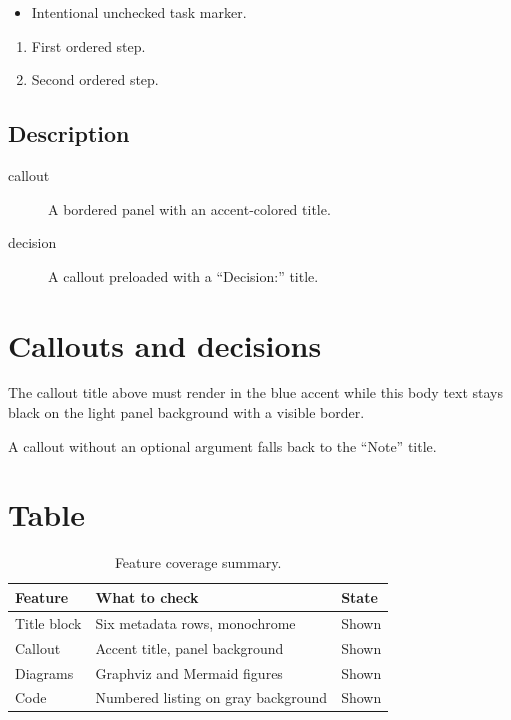 \documentclass{texlr}
\begin{document}
\begin{itemize}[label=$\square$]
  \item Intentional unchecked task marker.
\end{itemize}

\begin{enumerate}
  \item First ordered step.
  \item Second ordered step.
\end{enumerate}

\subsection{Description}

\begin{description}
  \item[callout] A bordered panel with an accent-colored title.
  \item[decision] A callout preloaded with a ``Decision:'' title.
\end{description}

\section{Callouts and decisions}

\begin{callout}
The callout title above must render in the blue accent while this body text
stays black on the light panel background with a visible border.
\end{callout}

\begin{callout}
A callout without an optional argument falls back to the ``Note'' title.
\end{callout}


\section{Table}

\begin{table}[ht]
  \centering
  \caption{Feature coverage summary.}
  \label{tab:coverage}
  \begin{tabularx}{\linewidth}{@{}l X l@{}}
    \toprule
    Feature & What to check & State \\
    \midrule
    Title block & Six metadata rows, monochrome & Shown \\
    Callout & Accent title, panel background & Shown \\
    Diagrams & Graphviz and Mermaid figures & Shown \\
    Code & Numbered listing on gray background & Shown \\
    \bottomrule
  \end{tabularx}
\end{table}
\end{document}
